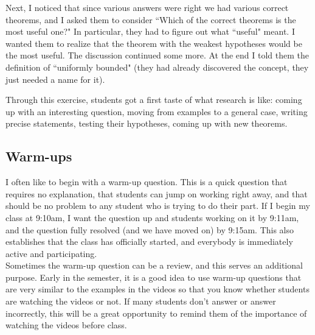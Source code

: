 \documentclass[11pt]{article}
\begin{document}
\begin{example}
\begin{comments}
Next, I noticed that since various answers were right we had various correct theorems, and I asked them to consider ``Which of the correct theorems is the most useful one?"  In particular, they had to figure out what ``useful" meant.  I wanted them to realize that the theorem with the weakest hypotheses would be the most useful.  The discussion continued some more.  At the end I told them the definition of ``uniformly bounded" (they had already discovered the concept, they just needed a name for it).

Through this exercise, students got a first taste of what research is like: coming up with an interesting question, moving from examples to a general case, writing precise statements, testing their hypotheses, coming up with new theorems.  
\end{comments}
\end{example}

\newpage

\subsection{Warm-ups}

I often like to begin with a warm-up question.  This is a quick question that requires no explanation, that students can jump on working right away, and that should be no problem to any student who is trying to do their part.  If I begin my class at 9:10am, I want the question up and students working on it by 9:11am, and the question fully resolved (and we have moved on) by 9:15am.   This also establishes that the class has officially started, and everybody is immediately active and participating.\\

Sometimes the warm-up question can be a review, and this serves an additional purpose. Early in the semester, it is a good idea to use warm-up questions that are very similar to the examples in the videos so that you know whether students are watching the videos or not. If many students don't answer or answer incorrectly, this will be a great opportunity to remind them of the importance of watching the videos before class.
\end{document}

